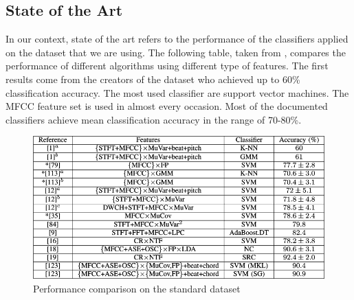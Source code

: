 \documentclass[a4paper,11pt,oneside]{article}
\begin{document}
\subsection{State of the Art}
In our context, state of the art refers to the performance of the classifiers applied
on the dataset that we are using. The following table, taken from \cite{survey2}, compares the performance
of different algorithms using different type of features. The first results come from the creators
of the dataset who achieved up to 60\% classification accuracy. The most used classifier are
support vector machines. The MFCC feature set is used in almost every occasion. Most of the documented 
classifiers achieve mean classification accuracy in the range of 70-80\%.
\begin{figure}[H]
  \includegraphics[scale=0.5]{art}
  \centering
  \caption{Performance comparison on the standard dataset}
\end{figure}
\end{document}
